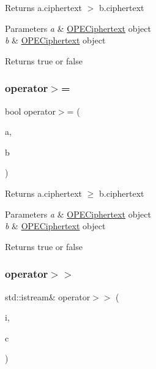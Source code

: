 Returns {\ttfamily a.\+ciphertext} $>$ {\ttfamily b.\+ciphertext} 
\begin{DoxyParams}{Parameters}
{\em a} & {\ttfamily \hyperlink{classOPECiphertext}{O\+P\+E\+Ciphertext}} object \\
\hline
{\em b} & {\ttfamily \hyperlink{classOPECiphertext}{O\+P\+E\+Ciphertext}} object \\
\hline
\end{DoxyParams}
\begin{DoxyReturn}{Returns}
{\ttfamily true} or {\ttfamily false} 
\end{DoxyReturn}
\mbox{\label{classOPECiphertext_a2e7887e9daea66096a9526a493cdc023}} 
\subsubsection{\texorpdfstring{operator$>$=}{operator>=}}
{\footnotesize\ttfamily bool operator$>$= (\begin{DoxyParamCaption}\item[{const \hyperlink{classOPECiphertext}{O\+P\+E\+Ciphertext} \&}]{a,  }\item[{const \hyperlink{classOPECiphertext}{O\+P\+E\+Ciphertext} \&}]{b }\end{DoxyParamCaption})\hspace{0.3cm}{\ttfamily [friend]}}

Returns {\ttfamily a.\+ciphertext} {$\ge$} {\ttfamily b.\+ciphertext} 
\begin{DoxyParams}{Parameters}
{\em a} & {\ttfamily \hyperlink{classOPECiphertext}{O\+P\+E\+Ciphertext}} object \\
\hline
{\em b} & {\ttfamily \hyperlink{classOPECiphertext}{O\+P\+E\+Ciphertext}} object \\
\hline
\end{DoxyParams}
\begin{DoxyReturn}{Returns}
{\ttfamily true} or {\ttfamily false} 
\end{DoxyReturn}
\mbox{\label{classOPECiphertext_a78faeb1ac9b11d0aa4337957b9fba288}} 
\subsubsection{\texorpdfstring{operator$>$$>$}{operator>>}}
{\footnotesize\ttfamily std\+::istream\& operator$>$$>$ (\begin{DoxyParamCaption}\item[{std\+::istream \&}]{i,  }\item[{\hyperlink{classOPECiphertext}{O\+P\+E\+Ciphertext} \&}]{c }\end{DoxyParamCaption})\hspace{0.3cm}{\ttfamily [friend]}}

